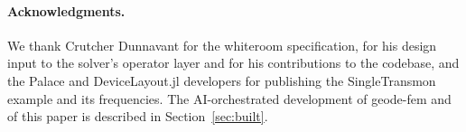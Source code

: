 \documentclass{anvil-paper}
\begin{document}
\paragraph{Acknowledgments.}
We thank Crutcher Dunnavant for the whiteroom specification, for his
design input to the solver's operator layer and for his contributions to
the codebase, and the Palace and DeviceLayout.jl developers for publishing
the SingleTransmon example and its frequencies. The AI-orchestrated
development of geode-fem and of this paper is described in
Section~\ref{sec:built}.



\end{document}
